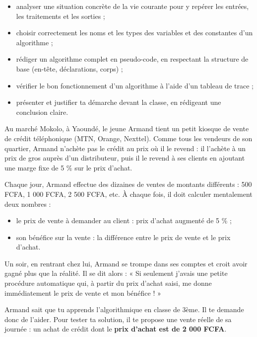 \documentclass[11pt]{article}
\newcommand{\cle}[1]{{\popxbold\color{popdark}#1}}
\newcounter{popsec}
\newcounter{popsub}
\newcommand{\courssub}[1]{%
  \stepcounter{popsub}%
  \par\vspace{9pt}\noindent{\popxbold\fontsize{11.5}{13}\selectfont\color{popink}{\color{poporange}\thepopsec.\thepopsub}\hspace{6pt}#1}\par\nopagebreak\vspace{4pt}
}
\begin{document}
\begin{itemize}
\item analyser une situation concrète de la vie courante pour y repérer les \cle{entrées}, les \cle{traitements} et les \cle{sorties} ;
\item choisir correctement les \cle{noms} et les \cle{types} des variables et des constantes d'un algorithme ;
\item rédiger un algorithme complet en \cle{pseudo-code}, en respectant la structure de base (en-tête, déclarations, corps) ;
\item vérifier le bon fonctionnement d'un algorithme à l'aide d'un \cle{tableau de trace} ;
\item présenter et \cle{justifier} ta démarche devant la classe, en rédigeant une conclusion claire.
\end{itemize}

\courssub{Situation}

Au marché Mokolo, à Yaoundé, le jeune Armand tient un petit kiosque de vente de crédit téléphonique (MTN, Orange, Nexttel). Comme tous les vendeurs de son quartier, Armand n'achète pas le crédit au prix où il le revend : il l'achète à un \cle{prix de gros} auprès d'un distributeur, puis il le revend à ses clients en ajoutant une \cle{marge fixe de 5 \%} sur le prix d'achat.

Chaque jour, Armand effectue des dizaines de ventes de montants différents : 500 FCFA, 1 000 FCFA, 2 500 FCFA, etc. À chaque fois, il doit calculer mentalement deux nombres :

\begin{itemize}
\item le \cle{prix de vente} à demander au client : prix d'achat augmenté de 5 \% ;
\item son \cle{bénéfice} sur la vente : la différence entre le prix de vente et le prix d'achat.
\end{itemize}

Un soir, en rentrant chez lui, Armand se trompe dans ses comptes et croit avoir gagné plus que la réalité. Il se dit alors : « Si seulement j'avais une petite procédure automatique qui, à partir du prix d'achat saisi, me donne immédiatement le prix de vente et mon bénéfice ! »

Armand sait que tu apprends l'algorithmique en classe de 3ème. Il te demande donc de l'aider. Pour tester ta solution, il te propose une vente réelle de sa journée : un achat de crédit dont le \textbf{prix d'achat est de 2 000 FCFA}.
\end{document}
